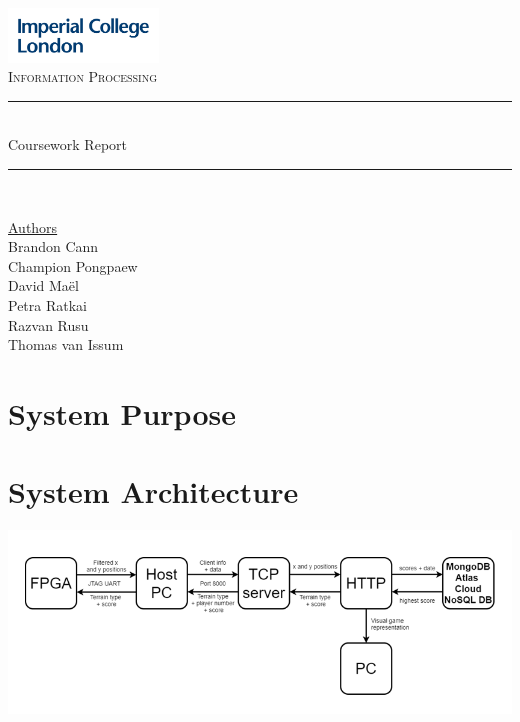 \documentclass[12pt,a4paper]{article}
\begin{document}
\begin{titlepage}
	\newcommand{\HRule}{\rule{\linewidth}{0.5mm}}
    \includegraphics[width = 4cm]{./Images/Logo.jpg}\\[0.5cm] 
    
    \center 
	\textsc{\large Information Processing }\\[0.3cm] 
    
	\HRule \\[0.3cm]
	Coursework Report
    \HRule \\[0.7cm]
     
    \begin{center}
		\underline{Authors}\\[0.1cm] Brandon Cann\\[0.1cm]
        Champion Pongpaew\\[0.1cm]
        David Maël\\[0.1cm]
        Petra Ratkai\\[0.1cm]
		Razvan Rusu\\[0.1cm]
		Thomas van Issum\\[0.7cm]
	\end{center} \large

    \tableofcontents

    \vfill %
\end{titlepage}

\section{System Purpose}

\section{System Architecture}
\includegraphics[width = 15cm]{Arch.PNG}
\end{document}
